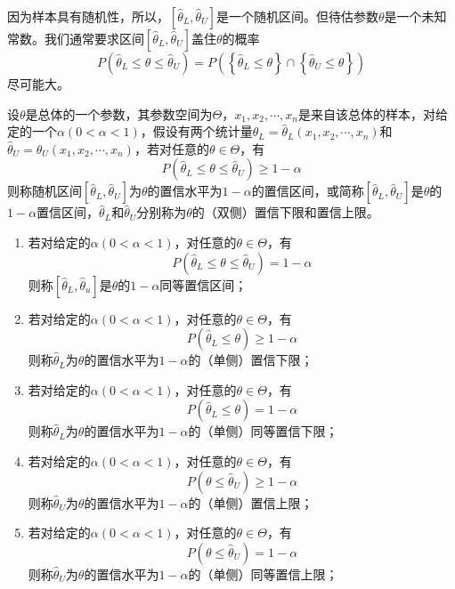 因为样本具有随机性，所以，$\left[ \hat{\theta}_{L},\hat{\theta}_{U} \right]$是一个随机区间。但待估参数$\theta$是一个未知常数。我们通常要求区间$\left[ \hat{\theta}_{L},\hat{\theta}_{U} \right]$盖住$\theta$的概率
$$
P(\hat{\theta}_{L}\leq \theta\leq \hat{\theta}_{U})=P\left ( \left \{ \hat{\theta}_{L}\le \theta \right \}\cap \left \{ \hat{\theta}_{U}\le \theta \right \}   \right ) 
$$
尽可能大。
\begin{definition}
设$\theta$是总体的一个参数，其参数空间为$\Theta$，$x_1,x_2,\cdots,x_n$是来自该总体的样本，对给定的一个$\alpha(0<\alpha<1)$，假设有两个统计量$\hat{\theta}_L = \hat{\theta}_L(x_1,x_2,\cdots,x_n)$和$\hat{\theta}_U = \hat{\theta}_U(x_1,x_2,\cdots,x_n)$，若对任意的$\theta \in  \Theta$，有
$$
P(\hat{\theta}_{L}\le \theta\le \hat{\theta}_{U}) \geq 1-\alpha
$$
则称随机区间$\left[ \hat{\theta}_{L},\hat{\theta}_{U} \right]$为$\theta$的置信水平为$1-\alpha$的置信区间，或简称$\left[ \hat{\theta}_{L},\hat{\theta}_{U} \right]$是$\theta$的$1-\alpha$置信区间，$\hat{\theta}_{L}$和$ \hat{\theta}_{U}$分别称为$\theta$的（双侧）置信下限和置信上限。
\end{definition}
\begin{remark}
    \begin{enumerate}
        \item 若对给定的$\alpha(0<\alpha<1)$，对任意的$\theta \in  \Theta$，有
$$
P(\hat{\theta}_{L}\le \theta\le \hat{\theta}_{U}) = 1-\alpha
$$
则称$\left[ \hat{\theta}_{L},\hat{\theta}_{u} \right]$是$\theta$的$1-\alpha$同等置信区间；
\item 若对给定的$\alpha(0<\alpha<1)$，对任意的$\theta \in  \Theta$，有
$$
P(\hat{\theta}_{L}\le \theta) \geq 1-\alpha
$$
则称$\hat{\theta}_{L}$为$\theta$的置信水平为$1-\alpha$的（单侧）置信下限；
\item 若对给定的$\alpha(0<\alpha<1)$，对任意的$\theta \in  \Theta$，有
$$
P(\hat{\theta}_{L}\le \theta) = 1-\alpha
$$
则称$\hat{\theta}_{L}$为$\theta$的置信水平为$1-\alpha$的（单侧）同等置信下限；
\item 若对给定的$\alpha(0<\alpha<1)$，对任意的$\theta \in  \Theta$，有
$$
P(\theta\leq \hat{\theta}_{U}) \geq 1-\alpha
$$
则称$\hat{\theta}_{U}$为$\theta$的置信水平为$1-\alpha$的（单侧）置信上限；
\item 若对给定的$\alpha(0<\alpha<1)$，对任意的$\theta \in  \Theta$，有
$$
P(\theta\leq \hat{\theta}_{U}) = 1-\alpha
$$
则称$\hat{\theta}_{U}$为$\theta$的置信水平为$1-\alpha$的（单侧）同等置信上限；
\end{enumerate}
\end{remark}
